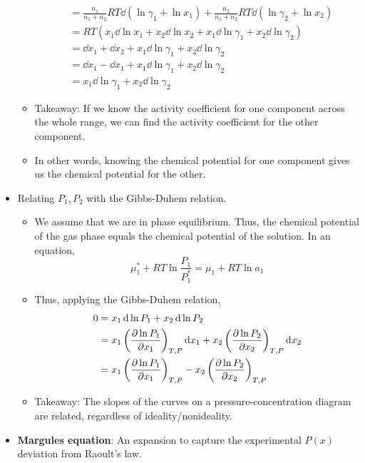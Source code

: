 \documentclass[../notes.tex]{subfiles}
\begin{document}
\begin{itemize}
\begin{itemize}
\begin{align*}
            &= \frac{n_1}{n_1+n_2}RT\dd{(\ln\gamma_1+\ln x_1)}+\frac{n_2}{n_1+n_2}RT\dd{(\ln\gamma_2+\ln x_2)}\\
            &= RT(x_1\dd{\ln x_1}+x_2\dd{\ln x_2}+x_1\dd{\ln\gamma_1}+x_2\dd{\ln\gamma_2})\\
            &= \dd{x_1}+\dd{x_2}+x_1\dd{\ln\gamma_1}+x_2\dd{\ln\gamma_2}\\
            &= \dd{x_1}-\dd{x_1}+x_1\dd{\ln\gamma_1}+x_2\dd{\ln\gamma_2}\\
            &= x_1\dd{\ln\gamma_1}+x_2\dd{\ln\gamma_2}
        \end{align*}
        \item Takeaway: If we know the activity coefficient for one component across the whole range, we can find the activity coefficient for the other component.
        \item In other words, knowing the chemical potential for one component gives us the chemical potential for the other.
    \end{itemize}
    \item Relating $P_1,P_2$ with the Gibbs-Duhem relation.
    \begin{itemize}
        \item We assume that we are in phase equilibrium. Thus, the chemical potential of the gas phase equals the chemical potential of the solution. In an equation,
        \begin{equation*}
            \mu_1^*+RT\ln\frac{P_1}{P_1^*} = \mu_1+RT\ln a_1
        \end{equation*}
        \item Thus, applying the Gibbs-Duhem relation,
        \begin{align*}
            0 &= x_1\dd{\ln P_1}+x_2\dd{\ln P_2}\\
            &= x_1\left( \pdv{\ln P_1}{x_1} \right)_{T,P}\dd{x_1}+x_2\left( \pdv{\ln P_2}{x_2} \right)_{T,P}\dd{x_2}\\
            &= x_1\left( \pdv{\ln P_1}{x_1} \right)_{T,P}-x_2\left( \pdv{\ln P_2}{x_2} \right)_{T,P}
        \end{align*}
        \item Takeaway: The slopes of the curves on a pressure-concentration diagram are related, regardless of ideality/nonideality.
    \end{itemize}
    \item \textbf{Margules equation}: An expansion to capture the experimental $P(x)$ deviation from Raoult's law.
    \begin{equation*}

\end{equation*}
\end{itemize}
\end{document}

